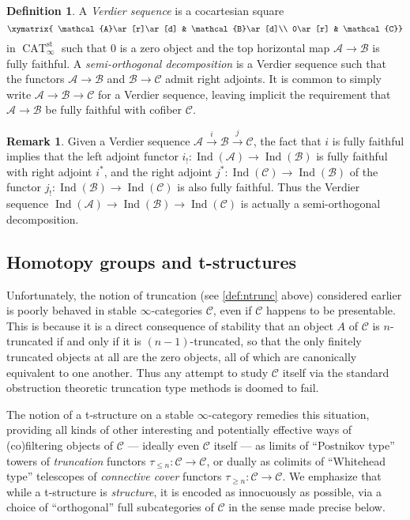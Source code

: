 \documentclass[12pt]{article}
\theoremstyle{definition}
\newtheorem{definition}{Definition}[subsection]
\newtheorem{remark}{Remark}[subsection]
\newcommand{\A}{\mathcal{A}}
\newcommand{\B}{\mathcal{B}}
\newcommand{\C}{\mathcal{C}}
\renewcommand{\i}{\infty}
\DeclareMathOperator{\CAT}{CAT}
\DeclareMathOperator{\Ind}{Ind}
\begin{document}
\begin{definition}
A {\em Verdier sequence}
is a cocartesian square
\[
\xymatrix{
\A\ar[r]\ar[d] & \B\ar[d]\\
0\ar[r] & \C}
\]
in $\CAT_\i^\mathrm{st}$ such that $0$ is a zero object and the top horizontal map $\A\to\B$ is fully faithful.
A {\em semi-orthogonal decomposition}
is a Verdier sequence such that the functors $\A\to\B$ and $\B\to\C$ admit right adjoints.
It is common to simply write $\A\to\B\to\C$ for a Verdier sequence, leaving implicit the requirement that $\A\to\B$ be fully faithful with cofiber $\C$.
\end{definition}


\begin{remark} 
Given a Verdier sequence $\A\overset{i}\to\B\overset{j}{\to}\C$, the fact that $i$ is fully faithful implies that the left adjoint functor $i_!:\Ind(\A)\to\Ind(\B)$ is fully faithful with right adjoint $i^*$, and the right adjoint $j^*:\Ind(\C)\to\Ind(\B)$ of the functor $j_!:\Ind(\B)\to\Ind(\C)$ is also fully faithful.
Thus the Verdier sequence $\Ind(\A)\to\Ind(\B)\to\Ind(\C)$ is actually a semi-orthogonal decomposition.
\end{remark}

\subsection{Homotopy groups and t-structures}

Unfortunately, the notion of truncation (see \autoref{def:ntrunc} above) considered earlier is poorly behaved in stable $\i$-categories $\C$, even if $\C$ happens to be presentable.
This is because it is a direct consequence of stability that an object $A$ of $\C$ is $n$-truncated if and only if it is $(n-1)$-truncated, so that the only finitely truncated objects at all are the zero objects, all of which are canonically equivalent to one another.
Thus any attempt to study $\C$ itself via the standard obstruction theoretic truncation type methods is doomed to fail.

The notion of a t-structure on a stable $\i$-category remedies this situation, providing all kinds of other interesting and potentially effective ways of (co)filtering objects of $\C$ --- ideally even $\C$ itself --- as limits of ``Postnikov type'' towers of {\em truncation} functors $\tau_{\leq n}:\C\to\C$, or dually as colimits of ``Whitehead type'' telescopes of {\em connective cover} functors $\tau_{\geq n}:\C\to\C$.
We emphasize that while a t-structure is {\em structure}, it is encoded as innocuously as possible, via a choice of ``orthogonal'' full subcategories of $\C$ in the sense made precise below.
\end{document}
